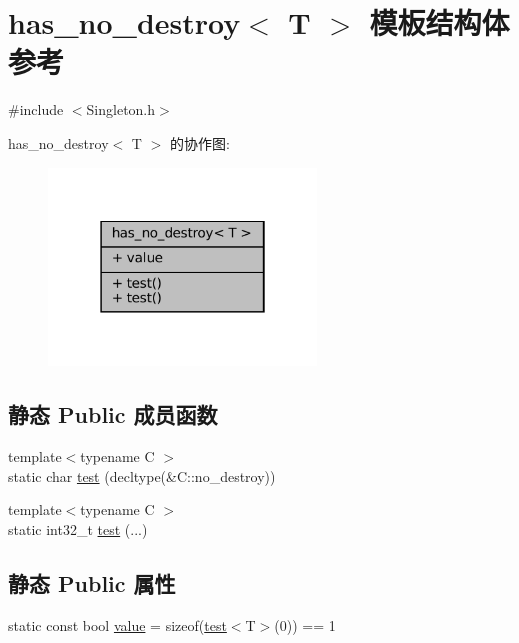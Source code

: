 \hypertarget{structmuduo_1_1detail_1_1has__no__destroy}{}\section{has\+\_\+no\+\_\+destroy$<$ T $>$ 模板结构体 参考}
\label{structmuduo_1_1detail_1_1has__no__destroy}


{\ttfamily \#include $<$Singleton.\+h$>$}



has\+\_\+no\+\_\+destroy$<$ T $>$ 的协作图\+:
\nopagebreak
\begin{figure}[H]
\begin{center}
\leavevmode
\includegraphics[width=202pt]{structmuduo_1_1detail_1_1has__no__destroy__coll__graph}
\end{center}
\end{figure}
\subsection*{静态 Public 成员函数}
\begin{DoxyCompactItemize}
\item 
{\footnotesize template$<$typename C $>$ }\\static char \hyperlink{structmuduo_1_1detail_1_1has__no__destroy_a94256a2ddc14889abdb41149c9b31137}{test} (decltype(\&C\+::no\+\_\+destroy))
\item 
{\footnotesize template$<$typename C $>$ }\\static int32\+\_\+t \hyperlink{structmuduo_1_1detail_1_1has__no__destroy_a3f2e6770d552e9c905498988412e048e}{test} (...)
\end{DoxyCompactItemize}
\subsection*{静态 Public 属性}
\begin{DoxyCompactItemize}
\item 
static const bool \hyperlink{structmuduo_1_1detail_1_1has__no__destroy_a11ddd051208250c32dc4985abcafa86d}{value} = sizeof(\hyperlink{structmuduo_1_1detail_1_1has__no__destroy_a94256a2ddc14889abdb41149c9b31137}{test}$<$T$>$(0)) == 1
\end{DoxyCompactItemize}


